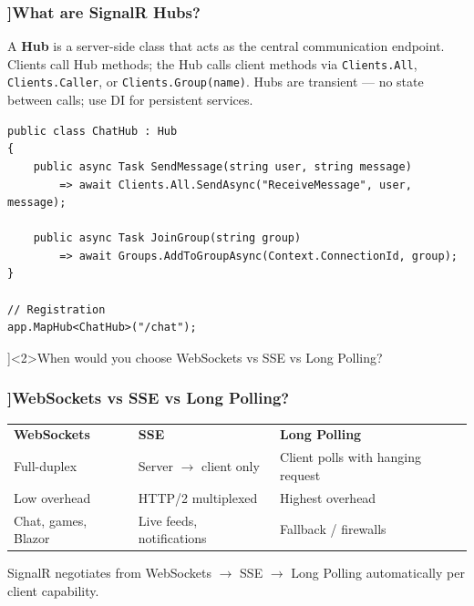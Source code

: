 \begin{frame}[fragile]
  \frametitle{\AnswerTitle[\CategoryBadge[RestColor!20]{REST \& SignalR}]{What are SignalR Hubs?}}

  {\footnotesize
  A \textbf{Hub} is a server-side class that acts as the central communication endpoint. Clients call Hub methods; the Hub calls client methods via \texttt{Clients.All}, \texttt{Clients.Caller}, or \texttt{Clients.Group(name)}. Hubs are transient — no state between calls; use DI for persistent services.
  }

  \begin{verbatim}
public class ChatHub : Hub
{
    public async Task SendMessage(string user, string message)
        => await Clients.All.SendAsync("ReceiveMessage", user, message);

    public async Task JoinGroup(string group)
        => await Groups.AddToGroupAsync(Context.ConnectionId, group);
}

// Registration
app.MapHub<ChatHub>("/chat");
  \end{verbatim}
\end{frame}

\QuestionSlide[\CategoryBadge[RestColor!20]{REST \& SignalR}]<2>{When would you choose WebSockets vs SSE vs Long Polling?}

\begin{frame}[fragile]
  \frametitle{\AnswerTitle[\CategoryBadge[RestColor!20]{REST \& SignalR}]{WebSockets vs SSE vs Long Polling?}}

  {\footnotesize
  \begin{tabular}{p{2.3cm}p{2.3cm}p{2.3cm}}
    \textbf{WebSockets} & \textbf{SSE} & \textbf{Long Polling} \\
    Full-duplex & Server $\to$ client only & Client polls with hanging request \\
    Low overhead & HTTP/2 multiplexed & Highest overhead \\
    Chat, games, Blazor & Live feeds, notifications & Fallback / firewalls \\
  \end{tabular}
  \vspace{0.5em}
  SignalR negotiates from WebSockets $\to$ SSE $\to$ Long Polling automatically per client capability.
  }
\end{frame}
